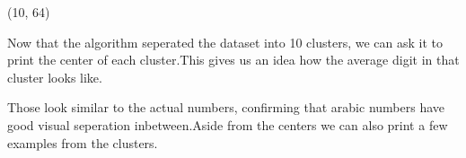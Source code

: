 \documentclass[letterpaper,10pt,english]{jupyterBook}
\begin{document}
\begin{sphinxVerbatim}[commandchars=\\\{\}]
(10, 64)
\end{sphinxVerbatim}

\sphinxAtStartPar
Now that the algorithm seperated the dataset into 10 clusters, we can ask it to print the center of each cluster.This gives us an idea how the average digit in that cluster looks like.

\begin{sphinxVerbatim}[commandchars=\\\{\}]
      
    
     
    \PYG{p}{[}\PYG{p}{]} \PYG{p}{[}\PYG{p}{]}
      
\end{sphinxVerbatim}

\noindent{}

\sphinxAtStartPar
Those look similar to the actual numbers, confirming that arabic numbers have good visual seperation inbetween.Aside from the centers we can also print a few examples from the clusters.
\end{document}
